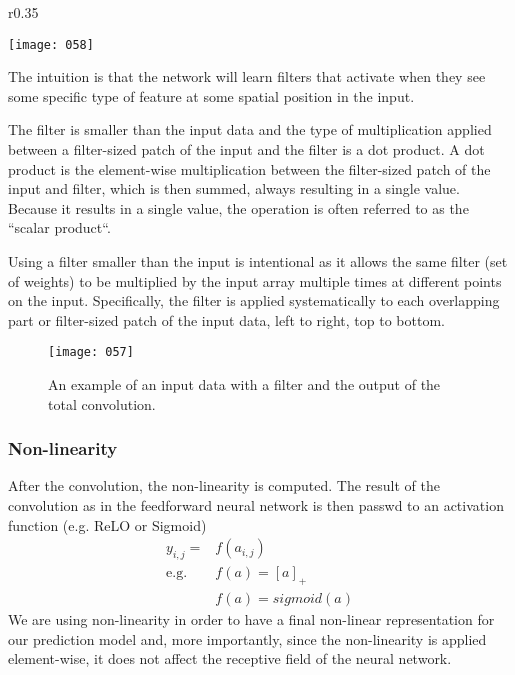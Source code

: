 \begin{wrapfigure}{r}{0.35\textwidth}
    \begin{center}
        \texttt{[image: 058]}
        \caption{}
    \end{center}
    \label{fig:058}
\end{wrapfigure}

The intuition is that the network will learn filters that activate when they see some specific type of feature at some spatial position in the input.

The filter is smaller than the input data and the type of multiplication applied between a filter-sized patch of the input and the filter is a dot product. A dot product is the element-wise multiplication between the filter-sized patch of the input and filter, which is then summed, always resulting in a single value. Because it results in a single value, the operation is often referred to as the “scalar product“.

Using a filter smaller than the input is intentional as it allows the same filter (set of weights) to be multiplied by the input array multiple times at different points on the input. Specifically, the filter is applied systematically to each overlapping part or filter-sized patch of the input data, left to right, top to bottom.

\begin{figure}[h!]
    \centering
    \texttt{[image: 057]}
    \caption{An example of an input data with a filter and the output of the total convolution.}
    \label{fig:057}
\end{figure}

\subsubsection{Non-linearity}
After the convolution, the non-linearity is computed. The result of the convolution as in the feedforward neural network is then passwd to an activation function (e.g. ReLO or Sigmoid)
\begin{align*}
    y_{i,j} = &f(a_{i,j})\\
    \text{e.g. } &f(a) = \left[a\right]_+\\
    &f(a) = sigmoid(a)
\end{align*} 
We are using non-linearity in order to have a final non-linear representation for our prediction model and, more importantly, since the non-linearity is applied element-wise, it does not affect the receptive field of the neural network.

